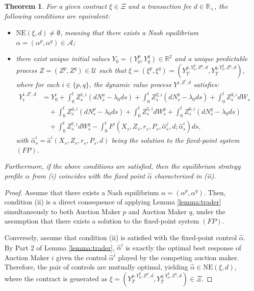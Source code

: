 \documentclass[12pt]{article}
\newtheorem{theorem}{Theorem}
\begin{document}
\begin{theorem}
\label{thm:main}
For a given contract $\xi \in \Xi$ and a transaction fee $d \in \mathbb{R}_+$, the following conditions are equivalent:

\begin{itemize}
    \item[(i)] $\text{NE}(\xi,d) \neq \emptyset$, meaning that there exists a Nash equilibrium $\alpha = ( \alpha^p,  \alpha^q) \in \mathcal{A}$;
    \item[(ii)] there exist unique initial values $Y_0 = (Y_0^p, Y_0^q) \in \mathbb{R}^2$ and a unique predictable process $Z = (Z^{p},Z^{q}) \in \mathcal{U}$ such that $\xi = (\xi^p, \xi^q) = (Y_T^{p, Y_0^p, Z^p, d}, Y_T^{q, Y_0^q, Z^q, d})$, where for each $i \in \{p,q\}$, the dynamic value process $Y^{i, Z^i, d}$ satisfies:
    \begin{align*}
        Y_t^{i,Z^i,d} &= Y^i_0 + \int_0^t Z^{1,i}_s (dN^{a}_s - \lambda_0 ds) + \int_0^t Z^{2,i}_s (dN^{b}_s - \lambda_0 ds) + \int_0^t Z^{3,i}_s dW_s \\
        &\quad + \int_0^t Z^{4,i}_s (dN^p_s - \lambda_0 ds) + \int_0^t Z^{5,i}_s dW^{p}_s + \int_0^t Z^{6,i}_s (dN^{q}_s - \lambda_0 ds) \\
        &\quad + \int_0^t Z^{7,i}_s dW^{q}_s - \int_0^t F^i(X_s,Z_s,r_s,P_s, \hat{\alpha}^j_s,d;\hat{\alpha}^i_s) ds,
    \end{align*}
    with $\hat{\alpha}^i_s = \hat{a}^i(X_s,Z_s,r_s,P_s,d)$ being the solution to the fixed-point system $(FP)$.
\end{itemize}

Furthermore, if the above conditions are satisfied, then the equilibrium strategy profile $\alpha$ from (i) coincides with the fixed point $\hat{\alpha}$ characterized in (ii).
\end{theorem}

\begin{proof}
    Assume that there exists a Nash equilibrium $\alpha=(\alpha^p,\alpha^q)$. Then, condition (ii) is a direct consequence of applying Lemma \ref{lemma:trader} simultaneously to both Auction Maker $p$ and Auction Maker $q$, under the assumption that there exists a solution to the fixed-point system $(FP)$. 
    
    Conversely, assume that condition (ii) is satisfied with the fixed-point control $\hat{\alpha}$. By Part 2 of Lemma \ref{lemma:trader}, $\hat{\alpha}^i$ is exactly the optimal best response of Auction Maker $i$ given the control $\hat{\alpha}^j$ played by the competing auction maker. Therefore, the pair of controls are mutually optimal, yielding $\hat{\alpha} \in \text{NE}(\xi,d)$, where the contract is generated as $\xi = (Y_T^{p, Y_0^p, Z^p, d}, Y_T^{q, Y_0^q, Z^q, d}) \in \Xi$.
\end{proof}
\end{document}
